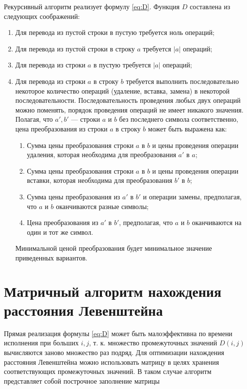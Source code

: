 \documentclass[12pt]{report}
\begin{document}
Рекурсивный алгоритм реализует формулу \ref{eq:D}.
Функция $D$ составлена из следующих соображений:
\begin{enumerate}
	\item Для перевода из пустой строки в пустую требуется ноль операций;
	\item Для перевода из пустой строки в строку $a$ требуется $|a|$ операций;
	\item Для перевода из строки $a$ в пустую требуется $|a|$ операций;
	\item Для перевода из строки $a$ в строку $b$ требуется выполнить последовательно некоторое количество операций (удаление, вставка, замена) в некоторой последовательности. Последовательность проведения любых двух операций можно поменять, порядок проведения операций не имеет никакого значения. Полагая, что $a', b'$  — строки $a$ и $b$ без последнего символа соответственно, цена преобразования из строки $a$ в строку $b$ может быть выражена как:
	\begin{enumerate}
		\item Сумма цены преобразования строки $a$ в $b$ и цены проведения операции удаления, которая необходима для преобразования $a'$ в $a$;
		\item Сумма цены преобразования строки $a$ в $b$  и цены проведения операции вставки, которая необходима для преобразования $b'$ в $b$;
		\item Сумма цены преобразования из $a'$ в $b'$ и операции замены, предполагая, что $a$ и $b$ оканчиваются разные символы;
		\item Цена преобразования из $a'$ в $b'$, предполагая, что $a$ и $b$ оканчиваются на один и тот же символ.
	\end{enumerate}
	Минимальной ценой преобразования будет минимальное
	значение приведенных вариантов.
\end{enumerate}

\section{Матричный алгоритм нахождения расстояния Левенштейна}

Прямая реализация формулы \ref{eq:D} может быть малоэффективна по времени исполнения при больших $i, j$, т. к. множество промежуточных значений $D(i, j)$ вычисляются заново множество раз подряд. Для оптимизации нахождения расстояния Левенштейна можно использовать матрицу в целях хранения соответствующих промежуточных значений. В таком случае алгоритм представляет собой построчное заполнение матрицы
\end{document}

